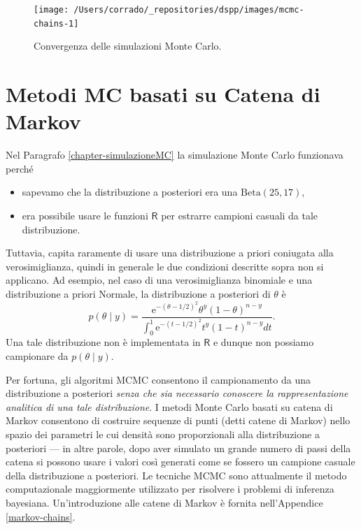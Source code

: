 \documentclass[
  10pt,
  italian,
  a4paper,
  extrafontsizes,onecolumn,openright
  ]{memoir}
\providecommand{\tightlist}{%
  \setlength{\itemsep}{0pt}\setlength{\parskip}{0pt}}
\newcommand{\R}{\textsf{R}} %
\begin{document}
\begin{figure}[h]

{\centering \texttt{[image: /Users/corrado/\_repositories/dspp/images/mcmc-chains-1]} 

}

\caption{Convergenza delle simulazioni Monte Carlo.}\label{fig:mcmc-chains-1}
\end{figure}

\hypertarget{metodi-mc-basati-su-catena-di-markov}{%
\section{Metodi MC basati su Catena di Markov}\label{metodi-mc-basati-su-catena-di-markov}}

Nel Paragrafo \ref{chapter-simulazioneMC} la simulazione Monte Carlo funzionava perché

\begin{itemize}
\tightlist
\item
  sapevamo che la distribuzione a posteriori era una \(\mbox{Beta}(25, 17)\),
\item
  era possibile usare le funzioni \(\R\) per estrarre campioni casuali da tale distribuzione.
\end{itemize}

\noindent
Tuttavia, capita raramente di usare una distribuzione a priori coniugata alla verosimiglianza, quindi in generale le due condizioni descritte sopra non si applicano. Ad esempio, nel caso di una verosimiglianza binomiale e una distribuzione a priori Normale, la distribuzione a posteriori di \(\theta\) è
\[
p(\theta \mid y) = \frac{\mathrm{e}^{-(\theta - 1 / 2)^2} \theta^y (1 - \theta)^{n - y}} {\int_0^1 \mathrm{e}^{-(t - 1 / 2)^2} t^y (1 - t)^{n - y} dt}.
\]
\noindent
Una tale distribuzione non è implementata in \(\R\) e dunque non possiamo campionare da \(p(\theta \mid y)\).

Per fortuna, gli algoritmi MCMC consentono il campionamento da una distribuzione a posteriori \emph{senza che sia necessario conoscere la rappresentazione analitica di una tale distribuzione}. I metodi Monte Carlo basati su catena di Markov consentono di costruire sequenze di punti (detti catene di Markov) nello spazio dei parametri le cui densità sono proporzionali alla distribuzione a posteriori --- in altre parole, dopo aver simulato un grande numero di passi della catena si possono usare i valori così generati come se fossero un campione casuale della distribuzione a posteriori. Le tecniche MCMC sono attualmente il metodo computazionale maggiormente utilizzato per risolvere i problemi di inferenza bayesiana. Un'introduzione alle catene di Markov è fornita nell'Appendice \ref{markov-chains}.
\end{document}
